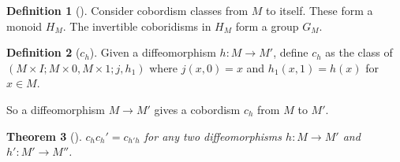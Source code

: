 \documentclass[reqno]{amsart}
\newtheorem{theorem}{Theorem}[section]
\theoremstyle{definition}
\newtheorem{definition}[theorem]{Definition}
\theoremstyle{remark}
\begin{document}
    \begin{definition}[]
        Consider cobordism classes from $M$ to itself.
        These form a monoid $H_M$. The invertible
        coboridisms in $H_M$ form a group $G_M$.
    \end{definition}

    \begin{definition}[$c_h$]
        Given a diffeomorphism
        $h \colon M \to M'$, define
        $c_h$ as the class of
        $\left( M \times I; M \times 0, M \times 1;
        j, h_1 \right) $ where
        $j (x,0) = x$ and
        $h_1 (x,1) = h(x)$ for $x \in M$.
    \end{definition}
    So a diffeomorphism
    $M \to M'$ gives a cobordism $c_h$ from $M$ to $M'$.

    \begin{theorem}[]
        $c_h c_h' = c_{h'h }$ for any two diffeomorphisms
        $h \colon M \to M'$ and
        $h' \colon M' \to M''$.
    \end{theorem}
\end{document}
